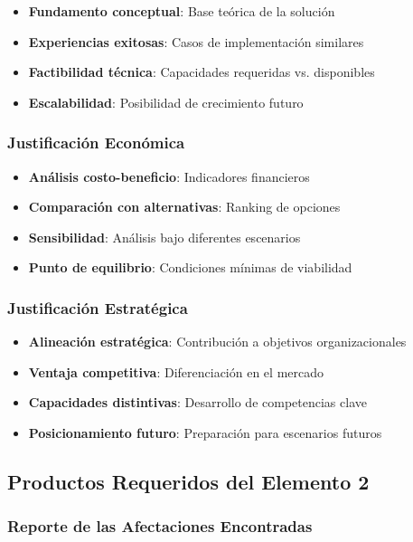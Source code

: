 \documentclass[12pt,letterpaper,oneside]{book}
\begin{document}
\begin{itemize}
\item \textbf{Fundamento conceptual}: Base teórica de la solución
\item \textbf{Experiencias exitosas}: Casos de implementación similares
\item \textbf{Factibilidad técnica}: Capacidades requeridas vs. disponibles
\item \textbf{Escalabilidad}: Posibilidad de crecimiento futuro
\end{itemize}

\subsubsection{Justificación Económica}

\begin{itemize}
\item \textbf{Análisis costo-beneficio}: Indicadores financieros
\item \textbf{Comparación con alternativas}: Ranking de opciones
\item \textbf{Sensibilidad}: Análisis bajo diferentes escenarios
\item \textbf{Punto de equilibrio}: Condiciones mínimas de viabilidad
\end{itemize}

\subsubsection{Justificación Estratégica}

\begin{itemize}
\item \textbf{Alineación estratégica}: Contribución a objetivos organizacionales
\item \textbf{Ventaja competitiva}: Diferenciación en el mercado
\item \textbf{Capacidades distintivas}: Desarrollo de competencias clave
\item \textbf{Posicionamiento futuro}: Preparación para escenarios futuros
\end{itemize}

\subsection{Productos Requeridos del Elemento 2}

\subsubsection{Reporte de las Afectaciones Encontradas}
\end{document}
